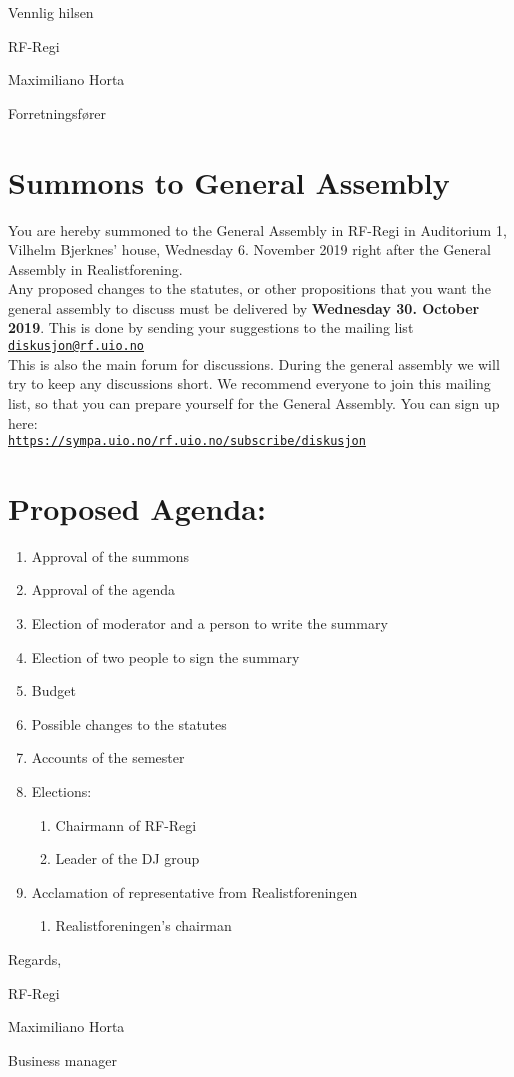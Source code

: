 \documentclass[a4paper]{article}
\begin{document}
\vspace{2.5cm}

Vennlig hilsen

RF-Regi

Maximiliano Horta

Forretningsfører

\newpage

\section*{\textsf{\textbf{\huge Summons to General Assembly}}}
\vspace{1cm}

You are hereby summoned to the General Assembly in RF-Regi in Auditorium 1,
Vilhelm Bjerknes' house, Wednesday 6. November 2019 right after
the General Assembly in Realistforening. \\


Any proposed changes to the statutes, or other propositions that you want the general
assembly to discuss must be delivered by \textbf{Wednesday 30. October 2019}.
This is done by sending your suggestions to the mailing list \linebreak
\href{mailto:diskusjon@rf.uio.no}{\texttt{diskusjon@rf.uio.no}} \\


This is also the main forum for discussions. During the general assembly we will try to keep
any discussions short. We recommend everyone to join this mailing list, so that you can
prepare yourself for the General Assembly. You can sign up here: \\
\texttt{\url{https://sympa.uio.no/rf.uio.no/subscribe/diskusjon}}\\

\section*{\textsf{Proposed Agenda:}}
\begin{enumerate}
    \item Approval of the summons
    \item Approval of the agenda
    \item Election of moderator and a person to write the summary
    \item Election of two people to sign the summary
    \item Budget 
    \item Possible changes to the statutes
    \item Accounts of the semester
    \item Elections:
    \begin{enumerate}
        \item Chairmann of RF-Regi
        \item Leader of the DJ group
    \end{enumerate}
    \item Acclamation of representative from Realistforeningen
    \begin{enumerate}
        \item Realistforeningen's chairman
    \end{enumerate}
\end{enumerate}

\vspace{2cm}
Regards,

RF-Regi

Maximiliano Horta

Business manager
\end{document}
